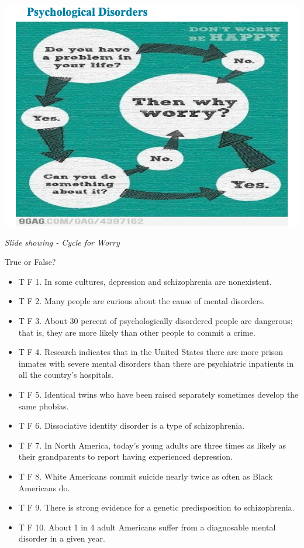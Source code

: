 \documentclass[
]{book}
\providecommand{\tightlist}{%
  \setlength{\itemsep}{0pt}\setlength{\parskip}{0pt}}
\begin{document}
\begin{reflect}
\includegraphics{assets/unit_10/slide_4.png}

\emph{Slide showing - Cycle for Worry}

True or False?

\begin{itemize}
\tightlist
\item
  T F 1. In some cultures, depression and schizophrenia are nonexistent.\\
\item
  T F 2. Many people are curious about the cause of mental disorders.\\
\item
  T F 3. About 30 percent of psychologically disordered people are dangerous; that is, they are more likely than other people to commit a crime.\\
\item
  T F 4. Research indicates that in the United States there are more prison inmates with severe mental disorders than there are psychiatric inpatients in all the country's hospitals.\\
\item
  T F 5. Identical twins who have been raised separately sometimes develop the same phobias.\\
\item
  T F 6. Dissociative identity disorder is a type of schizophrenia.\\
\item
  T F 7. In North America, today's young adults are three times as likely as their grandparents to report having experienced depression.\\
\item
  T F 8. White Americans commit suicide nearly twice as often as Black Americans do.\\
\item
  T F 9. There is strong evidence for a genetic predisposition to schizophrenia.\\
\item
  T F 10. About 1 in 4 adult Americans suffer from a diagnosable mental disorder in a given year.
\end{itemize}


\end{reflect}
\end{document}
